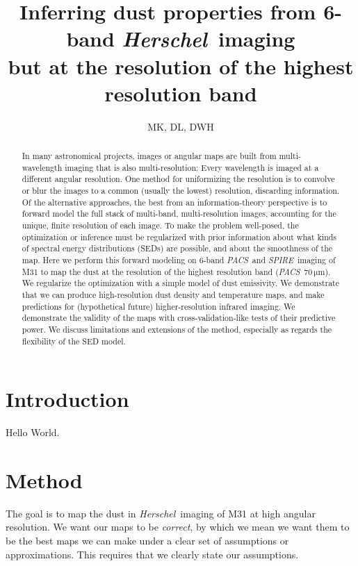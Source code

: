 \documentclass[12pt, preprint]{aastex}
\newcommand{\project}[1]{\textsl{#1}}
\newcommand{\Herschel}{\project{Herschel}}
\newcommand{\acronym}[1]{{\small{#1}}}
\newcommand{\PACS}{\project{\acronym{PACS}}}
\newcommand{\SPIRE}{\project{\acronym{SPIRE}}}
\newcommand{\unit}[1]{{\mathrm{#1}}}
\newcommand{\mum}{\unit{\mu m}}
\begin{document}
\title{Inferring dust properties from 6-band \Herschel\ imaging \\ 
       but at the resolution of the highest resolution band}
\author{MK, DL, DWH}

\begin{abstract}
In many astronomical projects, images or angular maps are built from
multi-wavelength imaging that is also multi-resolution:
Every wavelength is imaged at a different angular resolution.
One method for uniformizing the resolution is to convolve or blur the
images to a common (usually the lowest) resolution, discarding
information.
Of the alternative approaches, the best from an information-theory
perspective is to forward model the full stack of multi-band,
multi-resolution images, accounting for the unique, finite resolution
of each image.
To make the problem well-posed, the optimization or inference must be
regularized with prior information about what kinds of spectral energy
distributions (\acronym{SED}s) are possible, and about the smoothness of the map.
Here we perform this forward modeling on 6-band \PACS\ and
\SPIRE\ imaging of M31 to map the dust at the resolution of the
highest resolution band (\PACS~$70\,\mum$).
We regularize the optimization with a simple model of dust emissivity.
We demonstrate that we can produce high-resolution dust density and
temperature maps, and make predictions for (hypothetical future)
higher-resolution infrared imaging.
We demonstrate the validity of the maps with cross-validation-like
tests of their predictive power.
We discuss limitations and extensions of the method, especially as
regards the flexibility of the \acronym{SED} model.
\end{abstract}

\section{Introduction}

Hello World.

\section{Method}

The goal is to map the dust in \Herschel\ imaging of M31 at high
angular resolution.
We want our maps to be \emph{correct}, by which we mean we want them
to be the best maps we can make under a clear set of assumptions or
approximations.
This requires that we clearly state our assumptions.
\end{document}

